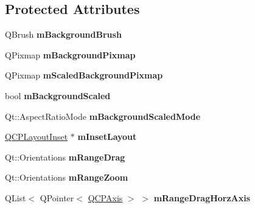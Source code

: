 \subsection*{Protected Attributes}
\begin{DoxyCompactItemize}
\item 
\mbox{\label{class_q_c_p_axis_rect_a5748e1a37f63c428e38b0a7724b46259}} 
Q\+Brush {\bfseries m\+Background\+Brush}
\item 
\mbox{\label{class_q_c_p_axis_rect_a38fb1a15f43228a0c124553649303722}} 
Q\+Pixmap {\bfseries m\+Background\+Pixmap}
\item 
\mbox{\label{class_q_c_p_axis_rect_aa74b9415598d59b49290e41e42d7ee27}} 
Q\+Pixmap {\bfseries m\+Scaled\+Background\+Pixmap}
\item 
\mbox{\label{class_q_c_p_axis_rect_a5ad835f0fae5d7cc5ada9e063641dbf1}} 
bool {\bfseries m\+Background\+Scaled}
\item 
\mbox{\label{class_q_c_p_axis_rect_a859fd368e794663e346b4f53f35078e9}} 
Qt\+::\+Aspect\+Ratio\+Mode {\bfseries m\+Background\+Scaled\+Mode}
\item 
\mbox{\label{class_q_c_p_axis_rect_a255240399e0fd24baad80cbbe46f698a}} 
\mbox{\hyperlink{class_q_c_p_layout_inset}{Q\+C\+P\+Layout\+Inset}} $\ast$ {\bfseries m\+Inset\+Layout}
\item 
\mbox{\label{class_q_c_p_axis_rect_aa9f107f66ca3469ad50ee6cea7c9e237}} 
Qt\+::\+Orientations {\bfseries m\+Range\+Drag}
\item 
\mbox{\label{class_q_c_p_axis_rect_a215eff671d48df2edccc36e7f976f28c}} 
Qt\+::\+Orientations {\bfseries m\+Range\+Zoom}
\item 
\mbox{\label{class_q_c_p_axis_rect_abd4f1d854b41a9c6730f3a3d605c42af}} 
Q\+List$<$ Q\+Pointer$<$ \mbox{\hyperlink{class_q_c_p_axis}{Q\+C\+P\+Axis}} $>$ $>$ {\bfseries m\+Range\+Drag\+Horz\+Axis}
\item 
\mbox{\label{class_q_c_p_axis_rect_a3b0a86e5bb136a458d7bc20773e45853}} 

\end{DoxyCompactItemize}
